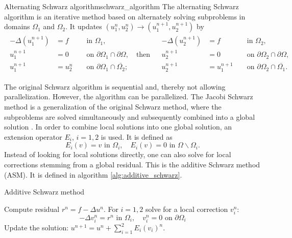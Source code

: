 \begin{fancydef}{Alternating Schwarz algorithm}{schwarz_algorithm}
  The alternating Schwarz algorithm is an iterative method based on alternately solving subproblems in domains $\Omega_1$ and $\Omega_2$. It updates $\left(u_1^n, u_2^n\right) \rightarrow\left(u_1^{n+1}, u_2^{n+1}\right)$ by
  \[
    \begin{array}{cc}
      \begin{aligned}
        -\Delta\left(u_1^{n+1}\right) & =f     &  & \text { in } \Omega_1,                                                 \\
        u_1^{n+1}                     & =0     &  & \text { on } \partial \Omega_1 \cap \partial \Omega, \quad \text{then} \\
        u_1^{n+1}                     & =u_2^n &  & \text { on } \partial \Omega_1 \cap \overline{\Omega_2} ;
      \end{aligned} &
      \begin{aligned}
        -\Delta\left(u_2^{n+1}\right) & =f         &  & \text { in } \Omega_2,                                   \\
        u_2^{n+1}                     & =0         &  & \text { on } \partial \Omega_2 \cap \partial \Omega,     \\
        u_2^{n+1}                     & =u_1^{n+1} &  & \text { on } \partial \Omega_2 \cap \overline{\Omega_1}.
      \end{aligned}
    \end{array}
  \]
\end{fancydef}

The original Schwarz algorithm is sequential and, thereby not allowing parallelization. However, the algorithm can be parallelized. The Jacobi Schwarz method is a generalization of the original Schwarz method, where the subproblems are solved simultaneously and subsequently combined into a global solution \cite{og_alternating_schwarz_Lions1990}. In order to combine local solutions into one global solution, an extension operator $E_i$, $i=1,2$ is used. It is defined as
\[
  E_i(v)=v \text { in } \Omega_i, \quad E_i(v)=0 \text { in } \Omega \backslash \Omega_i.
\]
Instead of looking for local solutions directly, one can also solve for local corrections stemming from a global residual. This is the additive Schwarz method (ASM). It is defined in algorithm \ref{alg:additive_schwarz}.
\begin{algorithm}[H]
  \caption{Additive Schwarz method \cite[Algorithm 1.2]{schwarz_methods_Dolean_2015}}
  \label{alg:additive_schwarz}
  \begin{algorithmic}
    \State Compute residual $r^n=f-\Delta u^n$.
    \State For $i=1,2$ solve for a local correction $v_i^n$:
    \[
      -\Delta v_i^n=r^n \text{ in } \Omega_i, \quad v_i^n=0 \text{ on } \partial \Omega_i
    \]
    \State Update the solution: $u^{n+1}=u^n+\sum_{i=1}^{2}E_i(v_i)^n$.
  \end{algorithmic}
\end{algorithm}

